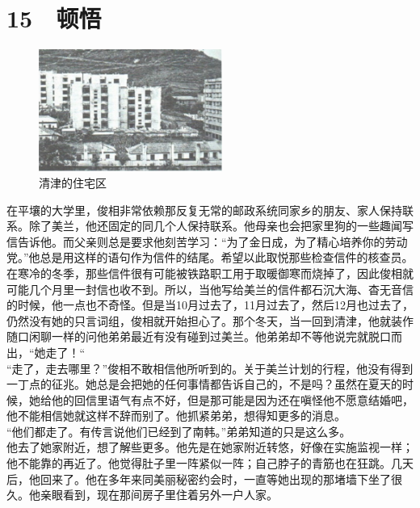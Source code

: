 \fancyhead[RO]{\thepage}
\fancyhead[LE]{\thepage}
\fancyfoot[LE,RO]{}
\fancyfoot[LO,CE]{}
\fancyfoot[CO,RE]{}
\chapter*{15 {\FA } 顿悟}
\begin{figure}[!htbp]
\centering
\includegraphics[width=6cm]{./Chapters/Images/15.jpg}
\caption*{清津的住宅区}
\end{figure}

在平壤的大学里，俊相非常依赖那反复无常的邮政系统同家乡的朋友、家人保持联系。除了美兰，他还固定的同几个人保持联系。他母亲也会把家里狗的一些趣闻写信告诉他。而父亲则总是要求他刻苦学习：“为了金日成，为了精心培养你的劳动党。”他总是用这样的语句作为信件的结尾。希望以此取悦那些检查信件的核查员。在寒冷的冬季，那些信件很有可能被铁路职工用于取暖御寒而烧掉了，因此俊相就可能几个月里一封信也收不到。所以，当他写给美兰的信件都石沉大海、杳无音信的时候，他一点也不奇怪。但是当10月过去了，11月过去了，然后12月也过去了，仍然没有她的只言词组，俊相就开始担心了。那个冬天，当一回到清津，他就装作随口闲聊一样的问他弟弟最近有没有碰到过美兰。他弟弟却不等他说完就脱口而出，“她走了！“\\

“走了，走去哪里？”俊相不敢相信他所听到的。关于美兰计划的行程，他没有得到一丁点的征兆。她总是会把她的任何事情都告诉自己的，不是吗？虽然在夏天的时候，她给他的回信里语气有点不好，但是那可能是因为还在嗔怪他不愿意结婚吧，他不能相信她就这样不辞而别了。他抓紧弟弟，想得知更多的消息。\\

“他们都走了。有传言说他们已经到了南韩。”弟弟知道的只是这么多。\\

他去了她家附近，想了解些更多。他先是在她家附近转悠，好像在实施监视一样；他不能靠的再近了。他觉得肚子里一阵紧似一阵；自己脖子的青筋也在狂跳。几天后，他回来了。他在多年来同美丽秘密约会时，一直等她出现的那堵墙下坐了很久。他亲眼看到，现在那间房子里住着另外一户人家。\\

